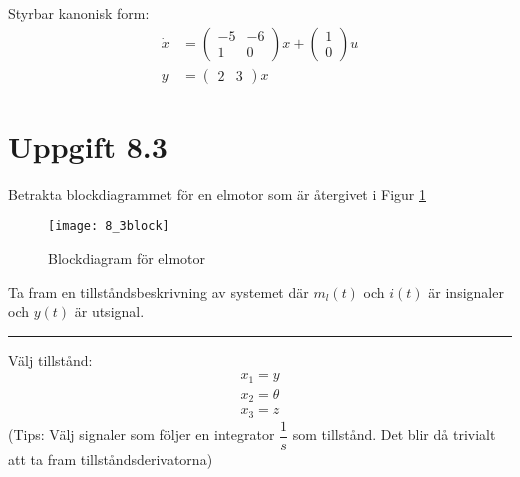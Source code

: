 \documentclass[12pt]{article}
\newcommand{\qline}{\hrule \vspace*{10pt}}
\begin{document}
Styrbar kanonisk form:
\begin{align*}
  \dot{x} &=
  \begin{pmatrix}
    -5 & -6 \\
    1 & 0
  \end{pmatrix}x +
            \begin{pmatrix}
              1 \\
              0              
            \end{pmatrix}u \\
  y &=
      \begin{pmatrix}
        2 & 3
      \end{pmatrix}x
\end{align*}

\section*{Uppgift 8.3}
Betrakta blockdiagrammet för en elmotor som är återgivet i Figur \ref{fig:83block}
\begin{figure}[h!]
  \centering
  \texttt{[image: 8\_3block]}
  \caption{Blockdiagram för elmotor}
  \label{fig:83block}
\end{figure}
\FloatBarrier
Ta fram en tillståndsbeskrivning av systemet där $m_l(t)$ och $i(t)$ är insignaler och $y(t)$ är utsignal.
\qline
Välj tillstånd:
\begin{align*}
  x_1 = y \\
  x_2 = \theta \\
  x_3 = z
\end{align*}
(Tips: Välj signaler som följer en integrator $\dfrac{1}{s}$ som tillstånd. Det blir då trivialt att ta fram tillståndsderivatorna) \\
\end{document}
